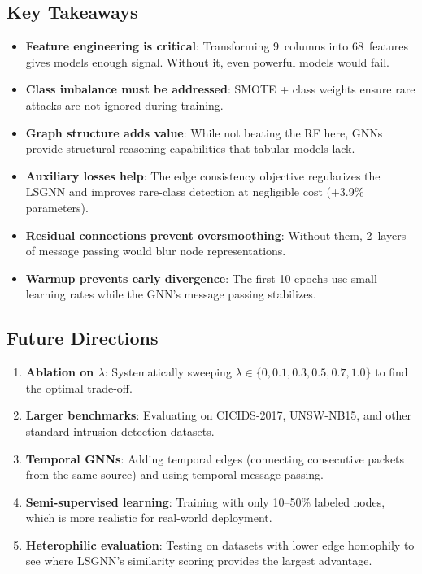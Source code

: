 \documentclass[conference]{IEEEtran}
\begin{document}
\subsection{Key Takeaways}

\begin{itemize}
    \item \textbf{Feature engineering is critical}: Transforming 9~columns into 68~features gives models enough signal. Without it, even powerful models would fail.
    \item \textbf{Class imbalance must be addressed}: SMOTE + class weights ensure rare attacks are not ignored during training.
    \item \textbf{Graph structure adds value}: While not beating the RF here, GNNs provide structural reasoning capabilities that tabular models lack.
    \item \textbf{Auxiliary losses help}: The edge consistency objective regularizes the LSGNN and improves rare-class detection at negligible cost (+3.9\% parameters).
    \item \textbf{Residual connections prevent oversmoothing}: Without them, 2~layers of message passing would blur node representations.
    \item \textbf{Warmup prevents early divergence}: The first 10 epochs use small learning rates while the GNN's message passing stabilizes.
\end{itemize}

\subsection{Future Directions}

\begin{enumerate}
    \item \textbf{Ablation on $\lambda$}: Systematically sweeping $\lambda \in \{0, 0.1, 0.3, 0.5, 0.7, 1.0\}$ to find the optimal trade-off.
    \item \textbf{Larger benchmarks}: Evaluating on CICIDS-2017, UNSW-NB15, and other standard intrusion detection datasets.
    \item \textbf{Temporal GNNs}: Adding temporal edges (connecting consecutive packets from the same source) and using temporal message passing.
    \item \textbf{Semi-supervised learning}: Training with only 10--50\% labeled nodes, which is more realistic for real-world deployment.
    \item \textbf{Heterophilic evaluation}: Testing on datasets with lower edge homophily to see where LSGNN's similarity scoring provides the largest advantage.
\end{enumerate}
\end{document}
